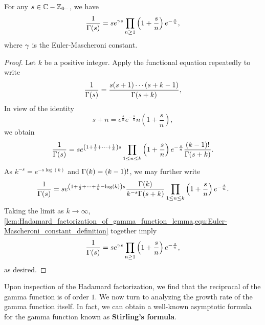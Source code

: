     \begin{theorem}\label{thm:Hadamard_factorization_for_reciprocal_of_gamma}
      For any \(s \in \mathbb{C}-\mathbb{Z}_{0-}\), we have
      \[
        \frac{1}{\Gamma(s)} = se^{\gamma s}\prod_{n \ge 1}\left(1+\frac{s}{n}\right)e^{-\frac{s}{n}},
      \]
      where \(\gamma\) is the Euler-Mascheroni constant.
    \end{theorem}
    \begin{proof}
      Let \(k\) be a positive integer. Apply the functional equation repeatedly to write
      \[
        \frac{1}{\Gamma(s)} = \frac{s(s+1) \cdots (s+k-1)}{\Gamma(s+k)},
      \]
      In view of the identity
      \[
        s+n = e^{\frac{s}{n}}e^{-\frac{s}{n}}n\left(1+\frac{s}{n}\right),
      \]
      we obtain
      \[
        \frac{1}{\Gamma(s)} = se^{\left(1+\frac{1}{2}+\cdots+\frac{1}{k}\right)s}\prod_{1 \le n \le k}\left(1+\frac{s}{n}\right)e^{-\frac{s}{n}}\frac{(k-1)!}{\Gamma(s+k)}.
      \]
      As \(k^{-s}= e^{-s\log(k)}\) and \(\Gamma(k) = (k-1)!\), we may further write
      \[
        \frac{1}{\Gamma(s)} = se^{\left(1+\frac{1}{2}+\cdots+\frac{1}{k}-\log(k)\right)s}\frac{\Gamma(k)}{k^{-s}\Gamma(s+k)}\prod_{1 \le n \le k}\left(1+\frac{s}{n}\right)e^{-\frac{s}{n}}.
      \]
      Taking the limit as \(k \to \infty\), \cref{lem:Hadamard_factorization_of_gamma_function_lemma,equ:Euler-Mascheroni_constant_definition} together imply
      \[
        \frac{1}{\Gamma(s)} = se^{\gamma s}\prod_{n \ge 1}\left(1+\frac{s}{n}\right)e^{-\frac{s}{n}},
      \]
      as desired.
    \end{proof}

    Upon inspection of the Hadamard factorization, we find that the reciprocal of the gamma function is of order \(1\). We now turn to analyzing the growth rate of the gamma function itself. In fact, we can obtain a well-known asymptotic formula for the gamma function known as \textbf{Stirling's formula}.

